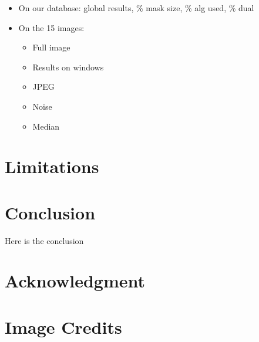 \documentclass{ipol}
\begin{document}
\begin{itemize}
    \item On our database: global results, \% mask size, \% alg used, \% dual
    \item On the 15 images:
    \begin{itemize}
        \item Full image
        \item Results on windows
        \item JPEG
        \item Noise
        \item Median
    \end{itemize}
\end{itemize}
\section{Limitations}

\section{Conclusion}

Here is the conclusion

\section*{Acknowledgment}


\section*{Image Credits}
{\small\flushleft

}



\end{document}
